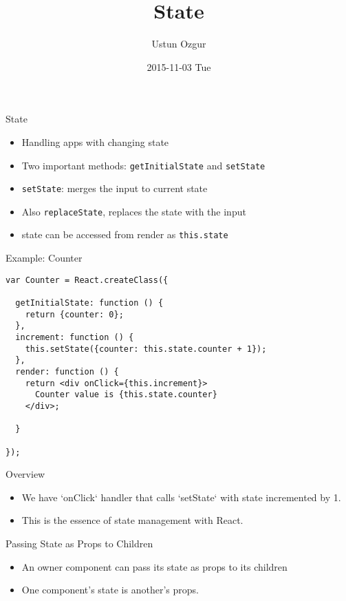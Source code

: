 \documentclass[presentation]{beamer}
\author{Ustun Ozgur}
\date{2015-11-03 Tue}
\title{State}
\begin{document}
\maketitle


\begin{frame}[fragile,label={sec:orgheadline1}]{State}
 \begin{itemize}
\item Handling apps with changing state
\item Two important methods: \texttt{getInitialState} and \texttt{setState}
\item \texttt{setState}: merges the input to current state
\item Also \texttt{replaceState}, replaces the state with the input
\item state can be accessed from render as \texttt{this.state}
\end{itemize}
\end{frame}

\begin{frame}[fragile,label={sec:orgheadline2}]{Example: Counter}
 \begin{verbatim}
var Counter = React.createClass({

  getInitialState: function () {
    return {counter: 0};
  },
  increment: function () {
    this.setState({counter: this.state.counter + 1});
  },
  render: function () {
    return <div onClick={this.increment}>
      Counter value is {this.state.counter}
    </div>;

  }

});
\end{verbatim}
\end{frame}

\begin{frame}[label={sec:orgheadline3}]{Overview}
\begin{itemize}
\item We have `onClick` handler that calls `setState` with state incremented
by 1.
\item This is the essence of state management with React.
\end{itemize}
\end{frame}

\begin{frame}[label={sec:orgheadline4}]{Passing State as Props to Children}
\begin{itemize}
\item An owner component can pass its state as props to its children
\item One component's state is another's props.
\end{itemize}
\end{frame}
\end{document}
